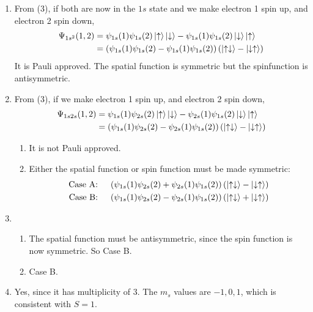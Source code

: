 \documentclass{homework}
\begin{document}
\begin{enumerate}
		\item From (3), if both are now in the $1s$ state and we make electron 1 spin up, and electron 2 spin down, \begin{align*}
			\Psi_{1s^2}(1, 2) & = \psi_{1s}(1) \psi_{1s}(2) \ket{\uparrow} \ket{\downarrow} - \psi_{1s}(1) \psi_{1s}(2) \ket{\downarrow} \ket{\uparrow} \\
			& = \left( \psi_{1s}(1) \psi_{1s}(2)  - \psi_{1s}(1) \psi_{1s}(2)\right) \left(\ket{\uparrow \downarrow} - \ket{\downarrow \uparrow}\right) 
		\end{align*}
		It is Pauli approved. The spatial function is symmetric but the spinfunction is antisymmetric.
		
		\item  From (3), if we make electron 1 spin up, and electron 2 spin down, \begin{align*}
			\Psi_{1s2s}(1, 2) & = \psi_{1s}(1) \psi_{2s}(2) \ket{\uparrow} \ket{\downarrow} - \psi_{2s}(1) \psi_{1s}(2) \ket{\downarrow} \ket{\uparrow} \\
			& = \left( \psi_{1s}(1) \psi_{2s}(2)  - \psi_{2s}(1) \psi_{1s}(2)\right) \left(\ket{\uparrow \downarrow} - \ket{\downarrow \uparrow}\right) 
		\end{align*}
		\begin{enumerate}
			\item It is not Pauli approved. 
			\item Either the spatial function or spin function must be made symmetric: \begin{align*}
				\text{Case A: \quad } & \left( \psi_{1s}(1) \psi_{2s}(2)  + \psi_{2s}(1) \psi_{1s}(2)\right) \left(\ket{\uparrow \downarrow} - \ket{\downarrow \uparrow}\right) \\
				\text{Case B: \quad } & \left( \psi_{1s}(1) \psi_{2s}(2)  - \psi_{2s}(1) \psi_{1s}(2)\right) \left(\ket{\uparrow \downarrow} + \ket{\downarrow \uparrow}\right) 
			\end{align*}
			
		\end{enumerate}
	
		\item \begin{enumerate}
			\item The spatial function must be antisymmetric, since the spin function is now symmetric. So Case B.
			\item Case B.
		\end{enumerate}
	
		\item Yes, since it has multiplicity of $3$. The $m_s$ values are $-1, 0, 1$, which is consistent with $S=1$.
		

\end{enumerate}
\end{document}
